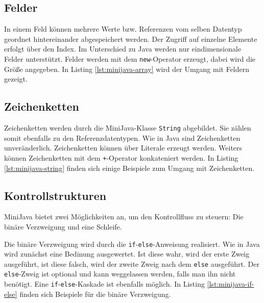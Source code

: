 

\subsection{Felder}
\label{subsec:MiniJava-Felder}

In einem Feld können mehrere Werte bzw. Referenzen vom selben Datentyp geordnet hintereinander abgespeichert werden. Der Zugriff auf einzelne Elemente erfolgt über den Index. Im Unterschied zu Java werden nur eindimensionale Felder unterstützt. Felder werden mit dem \lstinline{new}-Operator erzeugt, dabei wird die Größe angegeben. In Listing \ref{lst:minijava-array} wird der Umgang mit Feldern gezeigt.



\subsection{Zeichenketten}
\label{subsec:MiniJava-Zeichenketten}

Zeichenketten werden durch die MiniJava-Klasse \lstinline{String} abgebildet. Sie zählen somit ebenfalls zu den Referenzdatentypen. Wie in Java sind Zeichenketten unveränderlich. Zeichenketten können über Literale erzeugt werden. Weiters können Zeichenketten mit dem \lstinline{+}-Operator konkateniert werden. In Listing \ref{lst:minijava-string} finden sich einige Beispiele zum Umgang mit Zeichenketten.



\subsection{Kontrollstrukturen}

MiniJava bietet zwei Möglichkeiten an, um den Kontrollfluss zu steuern: Die binäre Verzweigung und eine Schleife.

Die binäre Verzweigung wird durch die \lstinline{if}-\lstinline{else}-Anweisung realisiert. Wie in Java wird zunächst eine Bedinung ausgewertet. Ist diese wahr, wird der erste Zweig ausgeführt, ist diese falsch, wird der zweite Zweig nach dem \lstinline{else} ausgeführt. Der \lstinline{else}-Zweig ist optional und kann weggelassen werden, falls man ihn nicht benötigt. Eine \lstinline{if}-\lstinline{else}-Kaskade ist ebenfalls möglich. In Listing \ref{lst:minijava-if-else} finden sich Beispiele für die binäre Verzweigung.

